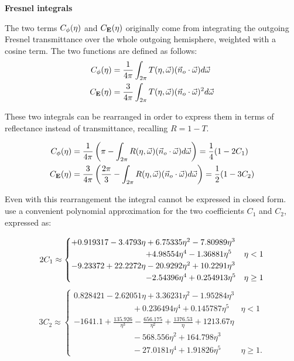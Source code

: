 \begin{mybox}
\begin{center}\textbf{Fresnel integrals}\end{center}
The two terms $C_{\phi}(\eta)$ and $C_{\mathbf{E}}(\eta)$ originally come from integrating the outgoing Fresnel transmittance over the whole outgoing hemisphere, weighted with a cosine term. The two functions are defined as follows: 
\begin{equation}
\begin{split}
C_{\phi}(\eta) &= \frac{1}{4\pi} \int_{2\pi} T(\eta,\vec{\omega}) (\vec{n}_o \cdot \vec{\omega}) d \vec{\omega} \\
C_{\mathbf{E}}(\eta) &= \frac{3}{4\pi} \int_{2\pi} T(\eta,\vec{\omega}) (\vec{n}_o \cdot \vec{\omega})^2 d \vec{\omega} \\
\end{split}
\end{equation}

These two integrals can be rearranged in order to express them in terms of reflectance instead of transmittance, recalling $R = 1 - T$.

\begin{equation}
\begin{split}
C_{\phi}(\eta) &= \frac{1}{4\pi} \left( \pi - \int_{2\pi} R(\eta,\vec{\omega}) (\vec{n}_o \cdot \vec{\omega}) d \vec{\omega} \right) = \frac{1}{4}(1 - 2 C_1)\\
C_{\mathbf{E}}(\eta) &= \frac{3}{4\pi} \left(\frac{2\pi}{3} - \int_{2\pi} R(\eta,\vec{\omega}) (\vec{n}_o \cdot \vec{\omega}) d \vec{\omega} \right) = \frac{1}{2}(1 - 3 C_2) \\
\end{split}
\end{equation}

Even with this rearrangement the integral cannot be expressed in closed form. \cite{D'Eon:2011:QMR:1964921.1964951} use a convenient polynomial approximation for the two coefficients $C_1$ and $C_2$, expressed as:

$$
2 C_1\approx 
\begin{cases}			
	+0.919317-3.4793\eta + 6.75335\eta^2 -7.80989\eta^3\\ \hspace{3.2cm}+4.98554\eta^4-1.36881\eta^5& \eta < 1 \\
	-9.23372 + 22.2272\eta-20.9292\eta^2 + 10.2291\eta^3\\ \hspace{3.2cm}-2.54396\eta^4 + 0.254913\eta^5 & \eta \geq 1

\end{cases}
$$
$$
3 C_2 \approx
\begin{cases}
0.828421-2.62051\eta + 3.36231\eta^2 -1.95284\eta^3\\ \hspace{3cm}+ 0.236494\eta^4 + 0.145787\eta^5 & \eta < 1 \\
-1641.1 + \frac{135.926}{\eta^3} - \frac{656.175}{\eta^2} + \frac{1376.53}{\eta} + 1213.67\eta \\ \hspace{3cm} -568.556\eta^2 + 164.798\eta^3\\ \hspace{3cm} -27.0181\eta^4 + 1.91826\eta^5 & \eta \geq 1.
\end{cases}
$$
\end{mybox}

